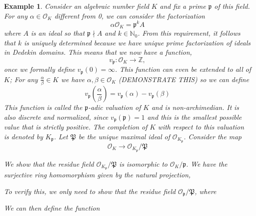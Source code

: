 \documentclass{article}
\newtheorem{example}{Example}[section]
\newcommand{\mfrak}[1]{\mathfrak{#1}}
\newcommand{\mcal}[1]{\mathcal{#1}}
\newcommand{\mbb}[1]{\mathbb{#1}}
\begin{document}
\begin{example}


    Consider an algebraic number field $K$ and fix a prime $\mfrak p$ of this field. For any $\alpha \in \mathcal O_K$ different from 0, we can consider the factorization
    $$\alpha \mcal O_K = \mfrak p^k A$$
    where $A$ is an ideal so that $\mfrak{p} \nmid A$ and $k \in \mbb N_0$. From this requirement, it follows that $k$ is uniquely determined because we have unique prime factorization of ideals in Dedekin domains. This means that we now have a function,
    $$v_\mfrak p : \mathcal O_K \to \mbb{Z},$$
    once we formally define $v_\mfrak p(0) = \infty$. This function can even be extended to all of $K$; For any $\frac{\alpha}{\beta} \in K$ we have $\alpha, \beta \in \mathcal O_K$ (DEMONSTRATE THIS) so we can define
    $$v_\mfrak p \left(\frac{\alpha}{\beta}\right) = v_\mfrak p(\alpha) - v_\mfrak p(\beta)$$    
    This function is called the $\mfrak p$-adic valuation of $K$ and is non-archimedian. It is also discrete and normalized, since $v_\mfrak p(\mfrak p) = 1$ and this is the smallest possible value that is strictly positive. The completion of $K$ with respect to this valuation is denoted by $K_\mfrak p$. Let $\mfrak P$ be the unique maximal ideal of $\mcal O_{K_\mfrak p}$. Consider the map 
    $$\mcal O_K \to \mcal O_{K_\mfrak p} / \mfrak P$$
    
    
    
    
    We show that the residue field $\mcal O_{K_\mfrak p} / \mfrak P$ is isomorphic to $\mcal O_K / \mfrak p$. We have the surjective ring homomorphism given by the natural projection, 
    
    To verify this, we only need to show that the residue field $\mcal O_\mfrak p / \mfrak P$, where 


    We can then define the function 
     

\end{example}
\end{document}
